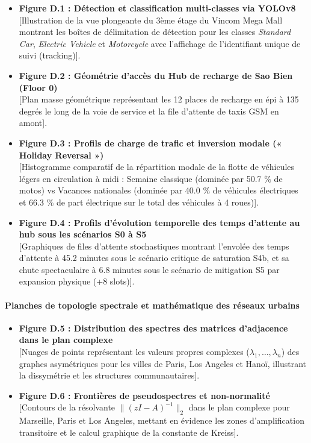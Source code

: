 \documentclass[10pt, a4paper]{article}
\providecommand{\tightlist}{}
\begin{document}
\begin{itemize}
\tightlist
\item
  \textbf{Figure D.1 : Détection et classification multi-classes via
  YOLOv8}\\
  {[}Illustration de la vue plongeante du 3ème étage du Vincom Mega Mall
  montrant les boîtes de délimitation de détection pour les classes
  \emph{Standard Car}, \emph{Electric Vehicle} et \emph{Motorcycle} avec
  l'affichage de l'identifiant unique de suivi (tracking){]}.
\item
  \textbf{Figure D.2 : Géométrie d'accès du Hub de recharge de Sao Bien
  (Floor 0)}\\
  {[}Plan masse géométrique représentant les 12 places de recharge en
  épi à 135 degrés le long de la voie de service et la file d'attente de
  taxis GSM en amont{]}.
\item
  \textbf{Figure D.3 : Profils de charge de trafic et inversion modale
  (« Holiday Reversal »)}\\
  {[}Histogramme comparatif de la répartition modale de la flotte de
  véhicules légers en circulation à midi : Semaine classique (dominée
  par 50.7 \% de motos) vs Vacances nationales (dominée par 40.0 \% de
  véhicules électriques et 66.3 \% de part électrique sur le total des
  véhicules à 4 roues){]}.
\item
  \textbf{Figure D.4 : Profils d'évolution temporelle des temps
  d'attente au hub sous les scénarios S0 à S5}\\
  {[}Graphiques de files d'attente stochastiques montrant l'envolée des
  temps d'attente à 45.2 minutes sous le scénario critique de saturation
  S4b, et sa chute spectaculaire à 6.8 minutes sous le scénario de
  mitigation S5 par expansion physique (+8 slots){]}.
\end{itemize}

\paragraph{Planches de topologie spectrale et mathématique des réseaux
urbains}\label{planches-de-topologie-spectrale-et-mathuxe9matique-des-ruxe9seaux-urbains}

\begin{itemize}
\tightlist
\item
  \textbf{Figure D.5 : Distribution des spectres des matrices
  d'adjacence dans le plan complexe}\\
  {[}Nuages de points représentant les valeurs propres complexes
  (\(\lambda_1, \dots, \lambda_n\)) des graphes asymétriques pour les
  villes de Paris, Los Angeles et Hanoï, illustrant la dissymétrie et
  les structures communautaires{]}.
\item
  \textbf{Figure D.6 : Frontières de pseudospectres et non-normalité}\\
  {[}Contours de la résolvante \(\|(zI - A)^{-1}\|_2\) dans le plan
  complexe pour Marseille, Paris et Los Angeles, mettant en évidence les
  zones d'amplification transitoire et le calcul graphique de la
  constante de Kreiss{]}.
\end{itemize}
\end{document}
